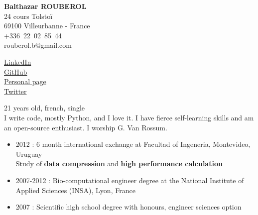 


\pagestyle{empty}

\begin{minipage}{0.6\textwidth}
\raggedright
{
        \textbf{\huge Balthazar ROUBEROL}\\
        \medskip
        {\scriptsize 24 cours Tolstoï \\
        69100 Villeurbanne - France \\
        +336~22~02~85~44 \\
        rouberol.b@gmail.com \\
        }
}
\end{minipage}
\begin{minipage}{0.395\textwidth}
\raggedleft
{	
		{\scriptsize
		\href{http://www.linkedin.com/profile/view?id=148957121\&locale=en\_US\&trk=tab\_pro}{LinkedIn} \\
		\href{https://github.com/BaltoRouberol}{GitHub}\\
		\href{http://page.brouberol.imap.cc}{Personal page}\\
        \href{https://twitter.com/BaltoRouberol}{Twitter}\\
        
        }
}
\end{minipage}

\bigskip


{\scriptsize 21 years old, french, single\\I write code, mostly Python, and I love it. I have fierce self-learning skills and am an open-source enthusiast. I worship G. Van Rossum.}\\

\vspace{-7mm}

\begin{itemize}
\renewcommand{\labelitemi}{$\circ$}
		\item 2012 : 6 month international exchange at Facultad of Ingeneria, Montevideo, Uruguay\\ Study of \textbf{data compression} and \textbf{high performance calculation}
        \item 2007-2012 : Bio-computational engineer degree at the National Institute of Applied Sciences (INSA), Lyon, France
        \item 2007 : Scientific high school degree with honours, engineer sciences option
\end{itemize}

